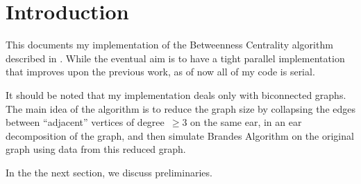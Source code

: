 \section{Introduction}
This documents my implementation of the Betweenness Centrality algorithm
described in \cite{pachorkar16}.
While the eventual aim is to have a tight parallel implementation that
improves upon the previous work, as of now all of my code is serial.

It should be noted that my implementation deals only with biconnected graphs.
The main idea of the algorithm is to reduce the graph size by collapsing
the edges between ``adjacent'' vertices of degree~$\geq 3$ on the same
ear, in an ear decomposition of the graph, and then simulate Brandes
Algorithm on the original graph using data from this reduced graph.

In the the next section, we discuss preliminaries.
